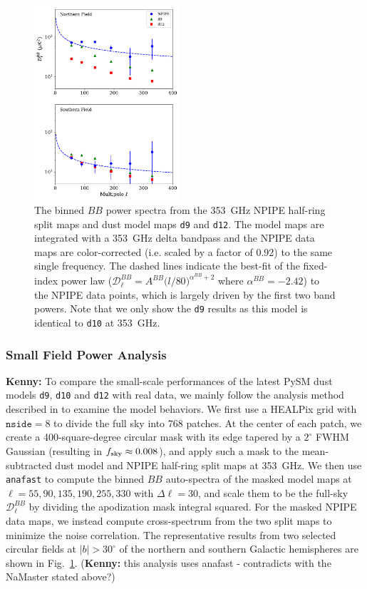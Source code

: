 \documentclass[twocolumn]{aastex631}
\begin{document}
\begin{figure}
    \centering
    \includegraphics[width=0.48\textwidth]{figures/smallfield_power.pdf}
    \caption{The binned $BB$ power spectra from the 353~GHz NPIPE half-ring split maps and dust model maps \texttt{d9} and \texttt{d12}. The model maps are integrated with a 353~GHz delta bandpass and the NPIPE data maps are color-corrected (i.e. scaled by a factor of 0.92) to the same single frequency. The dashed lines indicate the best-fit of the fixed-index power law ($\mathcal{D}_\ell^{BB} = A^{BB} \big( l/80 \big)^{\alpha^{BB}+2}$ where $\alpha^{BB} = -2.42$) to the NPIPE data points, which is largely driven by the first two band powers. Note that we only show the \texttt{d9} results as this model is identical to \texttt{d10} at 353~GHz.}
    \label{fig:smallfield_power}
\end{figure}

\subsubsection{Small Field Power Analysis} 

\textbf{Kenny:} To compare the small-scale performances of the latest PySM dust models \texttt{d9}, \texttt{d10} and \texttt{d12} with real data, we mainly follow the analysis method described in \cite{planck2014-XXX} to examine the model behaviors. We first use a HEALPix grid with $\texttt{nside} = 8$ to divide the full sky into 768 patches. At the center of each patch, we create a 400-square-degree circular mask with its edge tapered by a $2^\circ$ FWHM Gaussian (resulting in $f_{\rm sky} \approx 0.008$), and apply such a mask to the mean-subtracted dust model and NPIPE half-ring split maps at 353~GHz. We then use \texttt{anafast} to compute the binned $BB$ auto-spectra of the masked model maps at $\ell = 55,90,135,190,255,330$ with $\Delta \ell = 30$, and scale them to be the full-sky $\mathcal{D}_\ell^{BB}$ by dividing the apodization mask integral squared. For the masked NPIPE data maps, we instead compute cross-spectrum from the two split maps to minimize the noise correlation. The representative results from two selected circular fields at $|b| > 30^\circ$ of the northern and southern Galactic hemispheres are shown in Fig.~\ref{fig:smallfield_power}. (\textbf{Kenny:} this analysis uses anafast - contradicts with the NaMaster stated above?)
\end{document}
